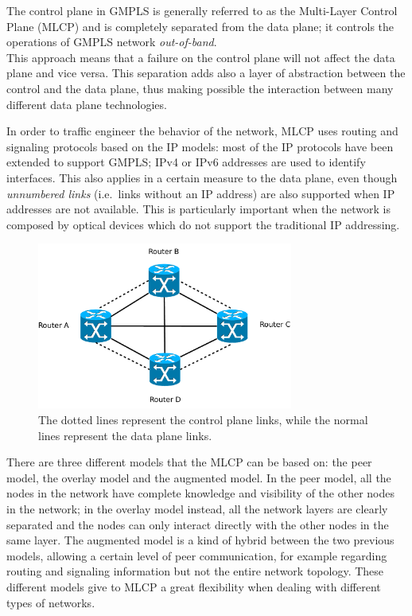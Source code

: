 \documentclass[10pt,a4paper]{report}
\begin{document}
The control plane in GMPLS is generally referred to as the Multi-Layer
Control Plane (MLCP) and is completely separated from the data plane;
it controls the operations of GMPLS network \textit{out-of-band}. \\
This approach means that a failure on the control plane will not
affect the data plane and vice versa. This separation adds also a
layer of abstraction between the control and the data plane, thus
making possible the interaction between many different data plane
technologies.

In order to traffic engineer the behavior of the network, MLCP uses
routing and signaling protocols based on the IP models: most of the IP
protocols have been extended to support GMPLS; IPv4 or IPv6 addresses
are used to identify interfaces. This also applies in a certain
measure to the data plane, even though \textit{unnumbered links}
(i.e.\ links without an IP address) are also supported when IP
addresses are not available. This is particularly important when the
network is composed by optical devices which do not support the
traditional IP addressing.

\begin{figure}[!htbp]
  \centering
  \includegraphics[width=0.75\textwidth]{img/gmpls_mlcp}
  \caption[Control and data links]{The dotted lines represent the
    control plane links, while the normal lines represent the data
    plane links.}
  \label{fig:gmpls_mlcp}
\end{figure}

There are three different models that the MLCP can be based on: the
peer model, the overlay model and the augmented model. In the peer
model, all the nodes in the network have complete knowledge and
visibility of the other nodes in the network; in the overlay model
instead, all the network layers are clearly separated and the nodes
can only interact directly with the other nodes in the same layer. The
augmented model is a kind of hybrid between the two previous models,
allowing a certain level of peer communication, for example regarding
routing and signaling information but not the entire network
topology. These different models give to MLCP a great flexibility when
dealing with different types of networks.
\end{document}
